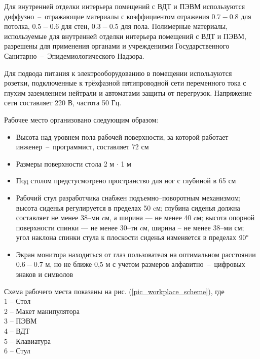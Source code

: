 Для внутренней отделки интерьера помещений с ВДТ и ПЭВМ используются
диффузно~--~отражающие материалы с коэффициентом отражения $0.7 - 0.8$ для потолка,
$0.5 - 0.6$ для стен, $0.3 - 0.5$ для пола. Полимерные материалы, используемые для
внутренней отделки интерьера помещений с ВДТ и ПЭВМ, разрешены для применения
органами и учреждениями Государственного Санитарно~--~Эпидемиологического
Надзора.

Для подвода питания к электрооборудованию в помещении используются розетки,
подключенные к трёхфазной пятипроводной сети переменного тока с глухим
заземлением нейтрали и автоматами защиты от перегрузок. Напряжение сети
составляет 220 В, частота 50 Гц.

Рабочее место организовано следующим образом:
\begin{itemize}
    \item   Высота над уровнем пола рабочей поверхности, за которой работает
            инженер~--~программист, составляет 72 см
    \item   Размеры поверхности стола 2 м $\cdot$ 1 м
    \item   Под столом предстусмотрено пространство для ног с глубиной в 65 см
    \item   Рабочий стул разработчика снабжен подъемно--поворотным механизмом; высота
            сиденья регулируется в пределах 50 cм; глубина сиденья должна составляет
            не менее 38--ми cм, а ширина --- не менее 40 cм;
            высота опорной поверхности спинки --- не менее 30--ти cм, ширина – не
            менее 38--ми см; угол наклона спинки стула к плоскости сиденья
            изменяется в пределах $90 \degree$
    \item   Экран монитора находиться от глаз пользователя на оптимальном
            расстоянии $0.6 - 0.7$ м, но не ближе 0,5 м с учетом размеров
            алфавитно~--~цифровых знаков и символов
\end{itemize}

Схема рабочего места показаны на рис. (\ref{pic_workplace_scheme}), где \\
1 -- Стол                \\
2 -- Макет манипулятора  \\
3 -- ПЭВМ                \\
4 -- ВДТ                 \\
5 -- Клавиатура          \\
6 -- Стул


